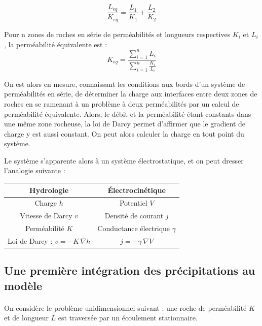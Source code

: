 \documentclass{article}
\begin{document}
$$ \dfrac{L_{eq}}{K_{eq}} = \dfrac{L_1}{K_1} + \dfrac{L_2}{K_2} $$

Pour n zones de roches en série de perméabilités et longueurs respectives $K_{i}$ et $L_{i}$, la perméabilité équivalente est :
$$K_{eq} = \frac{\sum\limits_{i=1}^{n}L_i}{\sum\limits_{i=1}^{n}\frac{K_i}{L_i}} $$

On est alors en mesure, connaissant les conditions aux bords d’un système de perméabilités en série, de déterminer la charge aux interfaces entre deux zones de roches en se ramenant à un problème à deux perméabilités par un calcul de perméabilité équivalente. Alors, le débit et la perméabilité étant constants dans une même zone rocheuse, la loi de Darcy permet d’affirmer que le gradient de charge y est aussi constant. On peut alors calculer la charge en tout point du système.

Le système s’apparente alors à un système électrostatique, et on peut dresser l’analogie suivante :
\setlength\tabcolsep{8pt}
\renewcommand{\arraystretch}{1.4}
\begin{center}
\begin{tabular}{ |c |c |}
\hline
 \textbf{Hydrologie} & \textbf{Électrocinétique} \\ 
 \hline
 Charge $h$ & Potentiel $V$ \\ 
 \hline
 Vitesse de Darcy $v$ & Densité de courant $j$  \\
 \hline
Perméabilité $K$ & Conductance électrique $\gamma$  \\
 \hline
Loi de Darcy : $v = -K\,\nabla h$ & $j = -\gamma\,\nabla V$  \\
 \hline
\end{tabular}
\end{center}

\subsection{Une première intégration des précipitations au modèle}
\paragraph{} On considère le problème unidimensionnel suivant : une roche de perméabilité $K$ et de longueur $L$ est traversée par un écoulement stationnaire.
\end{document}
